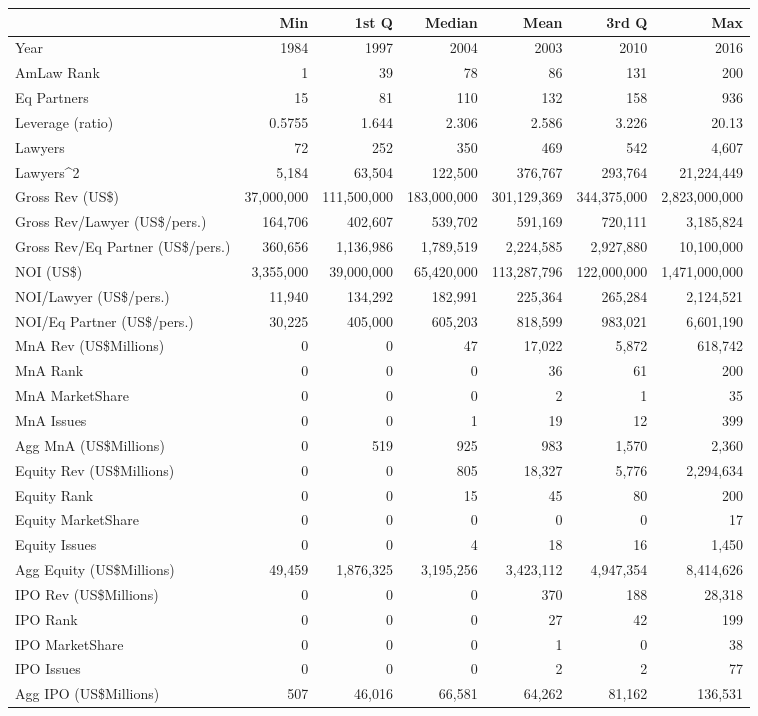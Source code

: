 \begin{table}[ht]
\centering
\begin{tabular}{lrrrrrr}
  \hline
 & Min & 1st Q & Median & Mean & 3rd Q & Max \\ 
  \hline
Year & 1984 & 1997 & 2004 & 2003 & 2010 & 2016 \\ 
  AmLaw Rank & 1 & 39 & 78 & 86 & 131 & 200 \\ 
  Eq Partners & 15 & 81 & 110 & 132 & 158 & 936 \\ 
  Leverage (ratio) & 0.5755 & 1.644 & 2.306 & 2.586 & 3.226 & 20.13 \\ 
  Lawyers & 72 & 252 & 350 & 469 & 542 & 4,607 \\ 
  Lawyers^2 & 5,184 & 63,504 & 122,500 & 376,767 & 293,764 & 21,224,449 \\ 
  Gross Rev (US\$) & 37,000,000 & 111,500,000 & 183,000,000 & 301,129,369 & 344,375,000 & 2,823,000,000 \\ 
  Gross Rev/Lawyer (US\$/pers.) & 164,706 & 402,607 & 539,702 & 591,169 & 720,111 & 3,185,824 \\ 
  Gross Rev/Eq Partner (US\$/pers.) & 360,656 & 1,136,986 & 1,789,519 & 2,224,585 & 2,927,880 & 10,100,000 \\ 
  NOI (US\$) & 3,355,000 & 39,000,000 & 65,420,000 & 113,287,796 & 122,000,000 & 1,471,000,000 \\ 
  NOI/Lawyer (US\$/pers.) & 11,940 & 134,292 & 182,991 & 225,364 & 265,284 & 2,124,521 \\ 
  NOI/Eq Partner (US\$/pers.) & 30,225 & 405,000 & 605,203 & 818,599 & 983,021 & 6,601,190 \\ 
  MnA Rev (US\$Millions) & 0 & 0 & 47 & 17,022 & 5,872 & 618,742 \\ 
  MnA  Rank & 0 & 0 & 0 & 36 & 61 & 200 \\ 
  MnA MarketShare & 0 & 0 & 0 & 2 & 1 & 35 \\ 
  MnA Issues & 0 & 0 & 1 & 19 & 12 & 399 \\ 
  Agg MnA (US\$Millions) & 0 & 519 & 925 & 983 & 1,570 & 2,360 \\ 
  Equity Rev (US\$Millions) & 0 & 0 & 805 & 18,327 & 5,776 & 2,294,634 \\ 
  Equity  Rank & 0 & 0 & 15 & 45 & 80 & 200 \\ 
  Equity MarketShare & 0 & 0 & 0 & 0 & 0 & 17 \\ 
  Equity Issues & 0 & 0 & 4 & 18 & 16 & 1,450 \\ 
  Agg Equity (US\$Millions) & 49,459 & 1,876,325 & 3,195,256 & 3,423,112 & 4,947,354 & 8,414,626 \\ 
  IPO Rev (US\$Millions) & 0 & 0 & 0 & 370 & 188 & 28,318 \\ 
  IPO  Rank & 0 & 0 & 0 & 27 & 42 & 199 \\ 
  IPO MarketShare & 0 & 0 & 0 & 1 & 0 & 38 \\ 
  IPO Issues & 0 & 0 & 0 & 2 & 2 & 77 \\ 
  Agg IPO (US\$Millions) & 507 & 46,016 & 66,581 & 64,262 & 81,162 & 136,531 \\ 
   \hline
\end{tabular}
\end{table}
